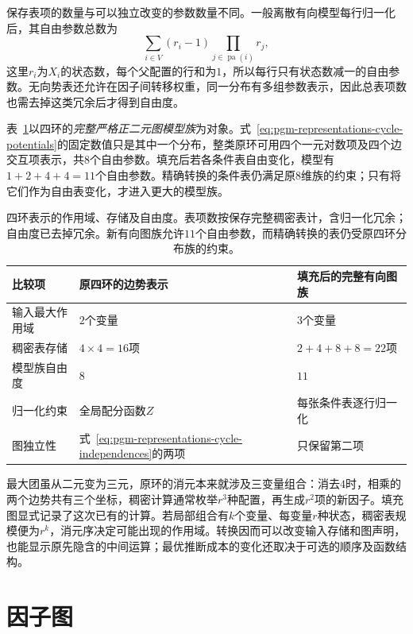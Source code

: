 保存表项的数量与可以独立改变的参数数量不同。一般离散有向模型每行归一化后，其自由参数总数为
\[
  \sum_{i\in V}(r_i-1)
  \prod_{j\in\operatorname{pa}(i)}r_j,
\]
这里$r_i$为$X_i$的状态数，每个父配置的行和为$1$，所以每行只有状态数减一的自由参数。无向势表还允许在因子间转移权重，同一分布有多组参数表示，因此总表项数也需去掉这类冗余后才得到自由度。

表~\ref{tab:pgm-representations-cycle-costs}以四环的\emph{完整严格正二元图模型族}为对象。式~\eqref{eq:pgm-representations-cycle-potentials}的固定数值只是其中一个分布，整类原环可用四个一元对数项及四个边交互项表示，共$8$个自由参数。填充后若各条件表自由变化，模型有$1+2+4+4=11$个自由参数。精确转换的条件表仍满足原$8$维族的约束；只有将它们作为自由表变化，才进入更大的模型族。

\begin{table}[htbp]
  \centering
  \begin{tabularx}{\linewidth}{@{}lXX@{}}
    \toprule
    比较项 & 原四环的边势表示 & 填充后的完整有向图族 \\
    \midrule
    输入最大作用域 & $2$个变量 & $3$个变量 \\
    稠密表存储 & $4\times4=16$项 & $2+4+8+8=22$项 \\
    模型族自由度 & $8$ & $11$ \\
    归一化约束 & 全局配分函数$Z$ & 每张条件表逐行归一化 \\
    图独立性 & 式~\eqref{eq:pgm-representations-cycle-independences}的两项 & 只保留第二项 \\
    \bottomrule
  \end{tabularx}
  \caption{四环表示的作用域、存储及自由度。表项数按保存完整稠密表计，含归一化冗余；自由度已去掉冗余。新有向图族允许$11$个自由参数，而精确转换的表仍受原四环分布族的约束。}
  \label{tab:pgm-representations-cycle-costs}
\end{table}

最大团虽从二元变为三元，原环的消元本来就涉及三变量组合：消去$4$时，相乘的两个边势共有三个坐标，稠密计算通常枚举$r^3$种配置，再生成$r^2$项的新因子。填充图显式记录了这次已有的计算。若局部组合有$k$个变量、每变量$r$种状态，稠密表规模便为$r^k$，消元序决定可能出现的作用域。转换因而可以改变输入存储和图声明，也能显示原先隐含的中间运算；最优推断成本的变化还取决于可选的顺序及函数结构。

\section{因子图}
\label{sec:pgm-representations-factor-graphs}

